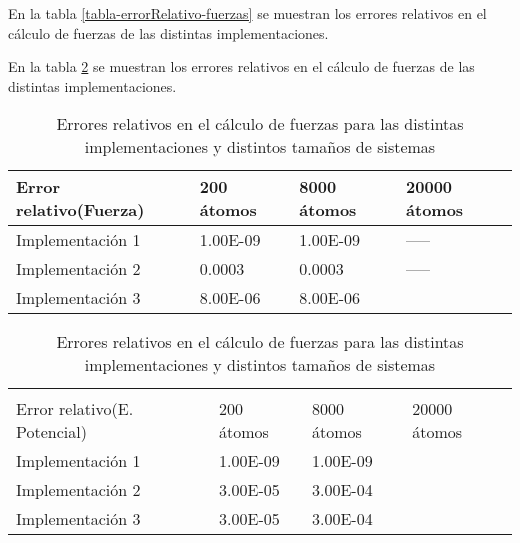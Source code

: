 En la tabla \ref{tabla-errorRelativo-fuerzas} se muestran los errores relativos en el cálculo de fuerzas de las distintas implementaciones.



En la tabla \ref{tabla-errorRelativo-potencial} se muestran los errores relativos en el cálculo de fuerzas de las distintas implementaciones.





\begin{table}[h]

\begin{minipage}{\linewidth}
\centering
\begin{tabular}{@{}llll@{}}

Error relativo(Fuerza)	 & 200 átomos            	& 8000 átomos        		& 20000 átomos \\ \bottomrule 
Implementación 1	 & 1.00E-09 			& 1.00E-09 			& 	-----	 \\ \hline
Implementación 2	 & 0.0003			& 0.0003			& 	-----	\\ \hline
Implementación 3	 & 8.00E-06 			& 8.00E-06			& 		 

\end{tabular}
\caption{Errores relativos en el cálculo de fuerzas para las distintas implementaciones y distintos tamaños de sistemas}
\label{tabla-errorRelativo-fuerzas}
\end{minipage}

\begin{minipage}{\linewidth}
\centering
\begin{tabular}{@{}llll@{}}
\\
\\
Error relativo(E. Potencial)	 & 200 átomos            	& 8000 átomos        		& 20000 átomos \\ \bottomrule 
Implementación 1	 & 1.00E-09 			& 1.00E-09 			& 		 \\ \hline
Implementación 2	 & 3.00E-05 			& 3.00E-04			&  		\\ \hline
Implementación 3	 & 3.00E-05	 		& 3.00E-04 			& 		 \\ \bottomrule

\end{tabular}
\end{minipage}
\caption{Errores relativos en el cálculo de fuerzas para las distintas implementaciones y distintos tamaños de sistemas}
\label{tabla-errorRelativo-potencial}
\end{table}


